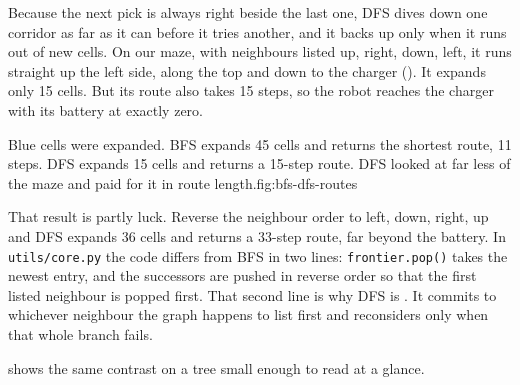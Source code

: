 Because the next pick is always right beside the last one, DFS dives down one corridor as far as it can before it tries another, and it backs up only when it runs out of new cells. On our maze, with neighbours listed up, right, down, left, it runs straight up the left side, along the top and down to the charger (). It expands only 15 cells. But its route also takes 15 steps, so the robot reaches the charger with its battery at exactly zero.

\begin{utpfig}{Blue cells were expanded. BFS expands 45 cells and returns the shortest route, 11 steps. DFS expands 15 cells and returns a 15-step route. DFS looked at far less of the maze and paid for it in route length.}{fig:bfs-dfs-routes}
\end{utpfig}

That result is partly luck. Reverse the neighbour order to left, down, right, up and DFS expands 36 cells and returns a 33-step route, far beyond the battery. In \texttt{utils/core.py} the code differs from BFS in two lines: \texttt{frontier.pop()} takes the newest entry, and the successors are pushed in reverse order so that the first listed neighbour is popped first. That second line is why DFS is . It commits to whichever neighbour the graph happens to list first and reconsiders only when that whole branch fails.

 shows the same contrast on a tree small enough to read at a glance.

